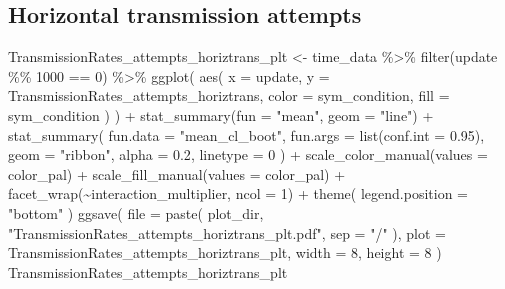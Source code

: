 \documentclass[
]{book}
\newenvironment{Shaded}{\begin{snugshade}}{\end{snugshade}}
\newcommand{\AttributeTok}[1]{\textcolor[rgb]{0.77,0.63,0.00}{#1}}
\newcommand{\DecValTok}[1]{\textcolor[rgb]{0.00,0.00,0.81}{#1}}
\newcommand{\FloatTok}[1]{\textcolor[rgb]{0.00,0.00,0.81}{#1}}
\newcommand{\FunctionTok}[1]{\textcolor[rgb]{0.00,0.00,0.00}{#1}}
\newcommand{\NormalTok}[1]{#1}
\newcommand{\OtherTok}[1]{\textcolor[rgb]{0.56,0.35,0.01}{#1}}
\newcommand{\SpecialCharTok}[1]{\textcolor[rgb]{0.00,0.00,0.00}{#1}}
\newcommand{\StringTok}[1]{\textcolor[rgb]{0.31,0.60,0.02}{#1}}
\begin{document}
\hypertarget{horizontal-transmission-attempts-4}{%
\subsection{Horizontal transmission attempts}\label{horizontal-transmission-attempts-4}}

\begin{Shaded}
\begin{Highlighting}[]
\NormalTok{TransmissionRates\_attempts\_horiztrans\_plt }\OtherTok{\textless{}{-}}\NormalTok{ time\_data }\SpecialCharTok{\%\textgreater{}\%}
  \FunctionTok{filter}\NormalTok{(update }\SpecialCharTok{\%\%} \DecValTok{1000} \SpecialCharTok{==} \DecValTok{0}\NormalTok{) }\SpecialCharTok{\%\textgreater{}\%}
  \FunctionTok{ggplot}\NormalTok{(}
    \FunctionTok{aes}\NormalTok{(}
      \AttributeTok{x =}\NormalTok{ update,}
      \AttributeTok{y =}\NormalTok{ TransmissionRates\_attempts\_horiztrans,}
      \AttributeTok{color =}\NormalTok{ sym\_condition,}
      \AttributeTok{fill =}\NormalTok{ sym\_condition}
\NormalTok{    )}
\NormalTok{  ) }\SpecialCharTok{+}
  \FunctionTok{stat\_summary}\NormalTok{(}\AttributeTok{fun =} \StringTok{"mean"}\NormalTok{, }\AttributeTok{geom =} \StringTok{"line"}\NormalTok{) }\SpecialCharTok{+}
  \FunctionTok{stat\_summary}\NormalTok{(}
    \AttributeTok{fun.data =} \StringTok{"mean\_cl\_boot"}\NormalTok{,}
    \AttributeTok{fun.args =} \FunctionTok{list}\NormalTok{(}\AttributeTok{conf.int =} \FloatTok{0.95}\NormalTok{),}
    \AttributeTok{geom =} \StringTok{"ribbon"}\NormalTok{,}
    \AttributeTok{alpha =} \FloatTok{0.2}\NormalTok{,}
    \AttributeTok{linetype =} \DecValTok{0}
\NormalTok{  ) }\SpecialCharTok{+}
  \FunctionTok{scale\_color\_manual}\NormalTok{(}\AttributeTok{values =}\NormalTok{ color\_pal) }\SpecialCharTok{+}
  \FunctionTok{scale\_fill\_manual}\NormalTok{(}\AttributeTok{values =}\NormalTok{ color\_pal) }\SpecialCharTok{+}
  \FunctionTok{facet\_wrap}\NormalTok{(}\SpecialCharTok{\textasciitilde{}}\NormalTok{interaction\_multiplier, }\AttributeTok{ncol =} \DecValTok{1}\NormalTok{) }\SpecialCharTok{+}
  \FunctionTok{theme}\NormalTok{(}
    \AttributeTok{legend.position =} \StringTok{"bottom"}
\NormalTok{  )}
\FunctionTok{ggsave}\NormalTok{(}
  \AttributeTok{file =} \FunctionTok{paste}\NormalTok{(}
\NormalTok{    plot\_dir,}
    \StringTok{"TransmissionRates\_attempts\_horiztrans\_plt.pdf"}\NormalTok{,}
    \AttributeTok{sep =} \StringTok{"/"}
\NormalTok{  ),}
  \AttributeTok{plot =}\NormalTok{ TransmissionRates\_attempts\_horiztrans\_plt,}
  \AttributeTok{width =} \DecValTok{8}\NormalTok{,}
  \AttributeTok{height =} \DecValTok{8}
\NormalTok{)}
\NormalTok{TransmissionRates\_attempts\_horiztrans\_plt}
\end{Highlighting}
\end{Shaded}
\end{document}
